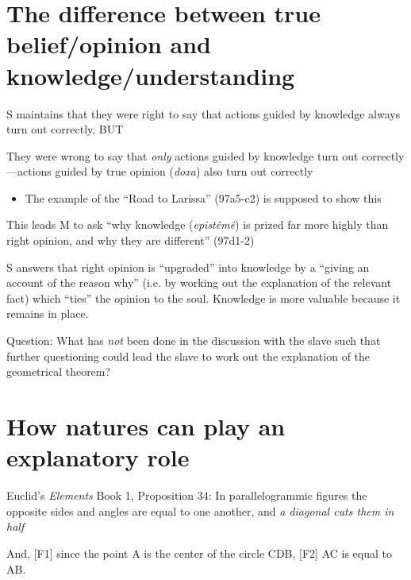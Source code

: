\documentclass[10 pt]{article}
\begin{document}
\section*{The difference between true belief/opinion and knowledge/understanding}

\noindent S maintains that they were right to say that actions guided by knowledge always turn out correctly, BUT
\vspace*{2mm}

\noindent They were wrong to say that \emph{only} actions guided by knowledge turn out correctly---actions guided by true opinion (\emph{doxa}) also turn out correctly

\begin{itemize}\item{The example of the ``Road to Larissa'' (97a5-c2) is supposed to show this}\end{itemize}

\noindent This leads M to ask ``why knowledge (\emph{epist\^{e}m\^{e}}) is prized far more highly than right opinion, and why they are different'' (97d1-2)
\vspace*{2mm}

\noindent S answers that right opinion is ``upgraded'' into knowledge by a ``giving an account of the reason why'' (i.e. by working out the explanation of the relevant fact) which ``ties'' the opinion to the soul. Knowledge is more valuable because it remains in place.
\vspace*{2mm}

\noindent Question: What has \emph{not} been done in the discussion with the slave such that further questioning could lead the slave to work out the explanation of the geometrical theorem?
\vspace*{2mm}

\section*{How natures can play an explanatory role}

\noindent Euclid's \emph{Elements} Book 1, Proposition 34: In parallelogrammic figures the opposite sides and angles are equal to one another, and \emph{a diagonal cuts them in half}
\vspace*{2mm}

\noindent And, [F1] since the point A is the center of the circle CDB, [F2] AC is equal to AB.
\end{document}
